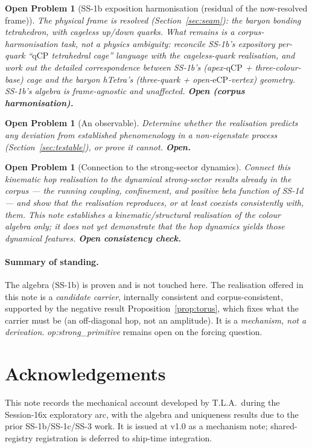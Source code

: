 \documentclass[11pt,a4paper]{article}
\newtheorem{openprob}[theorem]{Open Problem}
\newcommand{\qCP}{\mathrm{qCP}}
\newcommand{\eCP}{\mathrm{eCP}}
\begin{document}
\begin{openprob}[SS-1b exposition harmonisation (residual of the now-resolved frame)]
The physical frame is resolved (Section~\ref{sec:seam}): the baryon bonding
tetrahedron, with cageless up/down quarks. What remains is a corpus-harmonisation
task, not a physics ambiguity: reconcile SS-1b's expository per-quark
``$\qCP$ tetrahedral cage'' language with the cageless-quark realisation, and
work out the detailed correspondence between SS-1b's (apex-$\qCP$ +
three-colour-base) cage and the baryon hTetra's (three-quark + open-$\eCP$-vertex)
geometry. SS-1b's \emph{algebra} is frame-agnostic and unaffected.
\textbf{Open (corpus harmonisation).}
\end{openprob}

\begin{openprob}[An observable]
Determine whether the realisation predicts any deviation from established
phenomenology in a non-eigenstate process (Section~\ref{sec:testable}), or
prove it cannot. \textbf{Open.}
\end{openprob}

\begin{openprob}[Connection to the strong-sector dynamics]
Connect this kinematic hop realisation to the dynamical strong-sector results
already in the corpus --- the running coupling, confinement, and positive beta
function of SS-1d --- and show that the realisation reproduces, or at least
coexists consistently with, them. This note establishes a kinematic/structural
realisation of the colour algebra only; it does not yet demonstrate that the hop
dynamics yields those dynamical features. \textbf{Open consistency check.}
\end{openprob}

\paragraph{Summary of standing.} The algebra (SS-1b) is proven and is not
touched here. The realisation offered in this note is a \emph{candidate
carrier}, internally consistent and corpus-consistent, supported by the negative
result Proposition~\ref{prop:torus}, which fixes what the carrier must be (an
off-diagonal hop, not an amplitude). It is a \emph{mechanism, not a derivation}.
\emph{op:strong\_primitive} remains open on the forcing question.

\section*{Acknowledgements}
This note records the mechanical account developed by T.L.A.\ during the
Session-16x exploratory arc, with the algebra and uniqueness results due to the
prior SS-1b/SS-1c/SS-3 work. It is issued at v1.0 as a mechanism note;
shared-registry registration is deferred to ship-time integration.
\end{document}

